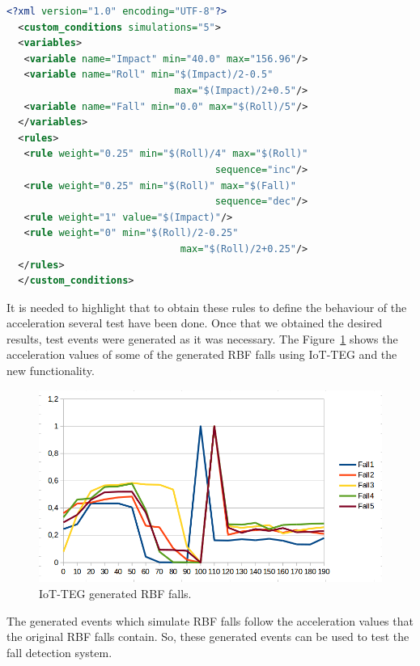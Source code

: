 \documentclass[conference]{IEEEtran}
\theoremstyle{definition}
\begin{document}
\begin{lstlisting}[basicstyle=\ttfamily\footnotesize,language=XML,caption={Rules to define a RBF fall},label=RBFFallRules]
  <?xml version="1.0" encoding="UTF-8"?>
  <custom_conditions simulations="5">
  <variables>
   <variable name="Impact" min="40.0" max="156.96"/>
   <variable name="Roll" min="$(Impact)/2-0.5" 
                             max="$(Impact)/2+0.5"/>
   <variable name="Fall" min="0.0" max="$(Roll)/5"/>
  </variables>
  <rules>
   <rule weight="0.25" min="$(Roll)/4" max="$(Roll)" 
                                    sequence="inc"/>
   <rule weight="0.25" min="$(Roll)" max="$(Fall)" 
                                    sequence="dec"/>
   <rule weight="1" value="$(Impact)"/>
   <rule weight="0" min="$(Roll)/2-0.25" 
                              max="$(Roll)/2+0.25"/>
  </rules>
  </custom_conditions>
\end{lstlisting}

It is needed to highlight that to obtain these rules to define the behaviour of the acceleration several test
have been done. Once that we obtained the desired results, test events were generated as it was necessary. The 
Figure~\ref{fig:IoTTEGRBFGeneratedEvents} shows the acceleration values of some of the generated RBF falls using
IoT-TEG and the new functionality.

\begin{figure}[!h]
  \centering
  \includegraphics[scale=0.3]{img/IoTTEGRBFGeneratedEvents}
  \caption[IoT-TEG generated RBF falls]{IoT-TEG generated RBF falls.}
  \label{fig:IoTTEGRBFGeneratedEvents}
\end{figure}

The generated events which simulate RBF falls follow the acceleration values that the original RBF falls contain.
So, these generated events can be used to test the fall detection system.
\end{document}
